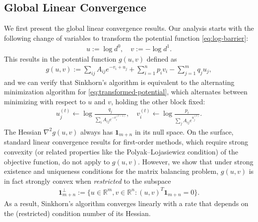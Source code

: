 \subsection{Global Linear Convergence}
\label{subsec:global-linear-convergence}
We first present the global linear convergence results. Our analysis starts with the following change of variables to transform the potential function \eqref{eq:log-barrier}:
\begin{align}
\label{eq:change-of-variables}
    u:=\log d^0,\quad v:=-\log d^1.
\end{align}
This results in the potential function $g(u,v)$ defined as
\begin{align}
\label{eq:transformed-potential}
  g(u,v)	:=\sum_{ij}A_{ij}e^{-v_{i}+u_{j}}+\sum_{i=1}^{n}p_{i}v_{i}-\sum_{j=1}^{m}q_{j}u_{j},
\end{align}
and we can verify that Sinkhorn's algorithm is equivalent to the alternating minimization algorithm \citep{bertsekas1997nonlinear,beck2013convergence} for \eqref{eq:transformed-potential}, which alternates between minimizing with respect to $u$ and $v$, holding the other block fixed:
\begin{align}
   \label{eq:alternating-minimization} u_j^{(t)}\leftarrow  \log \frac{q_j}{\sum_i A_{ij}e^{-v^{(t-1)}_i}},\quad v_i^{(t)}\leftarrow  \log \frac{p_i}{\sum_j A_{ij}e^{u^{(t)}_j}}.
\end{align}
The Hessian $\nabla^2g(u,v)$ always has $\mathbf{1}_{m+n}$ in its null space. On the surface, standard linear convergence results for first-order methods, which require strong convexity (or related properties like the Polyak--Lojasiewicz condition) of the objective function, do not apply to $g(u,v)$. However, we show that under strong existence and uniqueness conditions for the matrix balancing problem, $g(u,v)$ is in fact strongly convex when \emph{restricted} to the subspace 
\begin{align*}
   \mathbf{1}_{m+n}^\perp:= \{u\in \mathbb{R}^m,v\in \mathbb{R}^n:(u,v)^T\mathbf{1}_{m+n}=0\}.
\end{align*}
As a result, Sinkhorn's algorithm converges linearly with a rate that depends on the (restricted) condition number of its Hessian.

